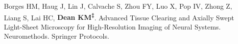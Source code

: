 \begin{etaremune}

\item Borges HM, Haug J, Lin J, Calvache S, Zhou FY, Luo X, Pop IV, Zhong Z, Liang S, Lai HC, \textbf{Dean KM\textsuperscript{‡}}. Advanced Tissue Clearing and Axially Swept Light-Sheet Microscopy for High-Resolution Imaging of Neural Systems. Neuromethods. Springer Protocols.

\end{etaremune}